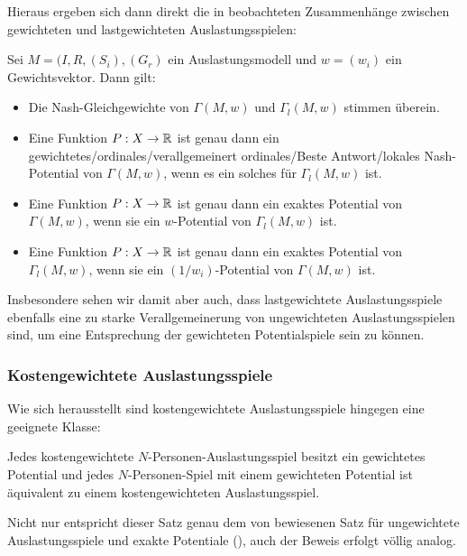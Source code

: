Hieraus ergeben sich dann direkt die in \cite{CharExGewPotinWCG} beobachteten Zusammenhänge zwischen gewichteten und lastgewichteten Auslastungsspielen:

\begin{kor}
	Sei $M = (I, R, (S_i), (G_r)$ ein Auslastungsmodell und $w = (w_i)$ ein Gewichtsvektor. Dann gilt:
	\begin{itemize}
		\item Die Nash-Gleichgewichte von $\Gamma(M, w)$ und $\Gamma_l(M,w)$ stimmen überein.
		\item Eine Funktion $P: X \to \mathbb{R}$ ist genau dann ein gewichtetes/ordinales/verallgemeinert ordinales/Beste Antwort/lokales Nash-Potential von $\Gamma(M, w)$, wenn es ein solches für $\Gamma_l(M,w)$ ist.
		\item Eine Funktion $P: X \to \mathbb{R}$ ist genau dann ein exaktes Potential von $\Gamma(M, w)$, wenn sie ein $w$-Potential von $\Gamma_l(M,w)$ ist.
		\item Eine Funktion $P: X \to \mathbb{R}$ ist genau dann ein exaktes Potential von $\Gamma_l(M, w)$, wenn sie ein $(1/w_i)$-Potential von $\Gamma(M,w)$ ist.		
	\end{itemize}
\end{kor}

Insbesondere sehen wir damit aber auch, dass lastgewichtete Auslastungsspiele ebenfalls eine zu starke Verallgemeinerung von ungewichteten Auslastungsspielen sind, um eine Entsprechung der gewichteten Potentialspiele sein zu können.


\subsubsection{Kostengewichtete Auslastungsspiele}

Wie sich herausstellt sind kostengewichtete Auslastungsspiele hingegen eine geeignete Klasse:

\begin{satz}
	Jedes kostengewichtete $N$-Personen-Auslastungsspiel besitzt ein gewichtetes Potential und jedes $N$-Personen-Spiel mit einem gewichteten Potential ist äquivalent zu einem kostengewichteten Auslastungsspiel.
\end{satz}

Nicht nur entspricht dieser Satz genau dem von \citeauthor{MonShap} bewiesenen Satz für ungewichtete Auslastungsspiele und exakte Potentiale (), auch der Beweis erfolgt völlig analog. 

